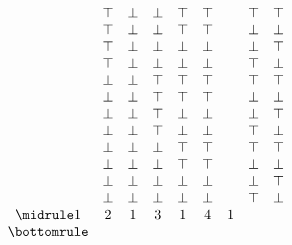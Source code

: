 \begin{myproof}
\begin{nlist}
\[\begin{array}{c c c c c c c c c}
                 & \top & \bot & \bot & \top & \top &  & \top & \top \\
                 & \top & \bot & \bot & \top & \top &  & \bot & \bot \\
                 & \top & \bot & \bot & \bot & \bot &  & \bot & \top \\
                 & \top & \bot & \bot & \bot & \bot &  & \top & \bot \\
                 & \bot & \bot & \top & \top & \top &  & \top & \top \\
                 & \bot & \bot & \top & \top & \top &  & \bot & \bot \\
                 & \bot & \bot & \top & \bot & \bot &  & \bot & \top \\
                 & \bot & \bot & \top & \bot & \bot &  & \top & \bot \\
                 & \bot & \bot & \bot & \top & \top &  & \top & \top \\
                 & \bot & \bot & \bot & \top & \top &  & \bot & \bot \\
                 & \bot & \bot & \bot & \bot & \bot &  & \bot & \top \\
                 & \bot & \bot & \bot & \bot & \bot &  & \top & \bot \\
                \midrule
                1 & 2 & 1 & 3 & 1 & 4 & 1
                \\
                \bottomrule
                \end{array}
        \]
    \end{nlist}
\end{myproof}